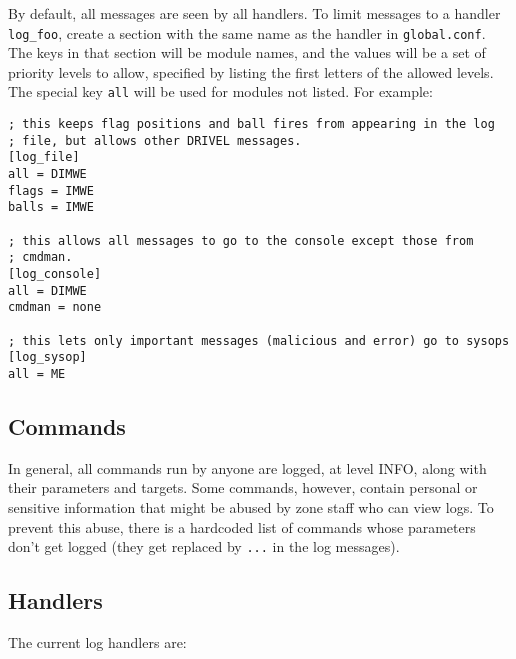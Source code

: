 \documentclass{article}
\begin{document}
By default, all messages are seen by all handlers. To limit messages to
a handler \verb/log_foo/, create a section with the same name as the
handler in \verb/global.conf/. The keys in that section will be module
names, and the values will be a set of priority levels to allow,
specified by listing the first letters of the allowed levels. The
special key \verb/all/ will be used for modules not listed. For example:

\begin{verbatim}
; this keeps flag positions and ball fires from appearing in the log
; file, but allows other DRIVEL messages.
[log_file]
all = DIMWE
flags = IMWE
balls = IMWE

; this allows all messages to go to the console except those from
; cmdman.
[log_console]
all = DIMWE
cmdman = none

; this lets only important messages (malicious and error) go to sysops
[log_sysop]
all = ME
\end{verbatim}


\subsection{Commands}

In general, all commands run by anyone are logged, at level INFO, along
with their parameters and targets. Some commands, however, contain
personal or sensitive information that might be abused by zone staff who
can view logs. To prevent this abuse, there is a hardcoded list of
commands whose parameters don't get logged (they get replaced by
\verb/.../ in the log messages).


\subsection{Handlers}

The current log handlers are:
\end{document}
